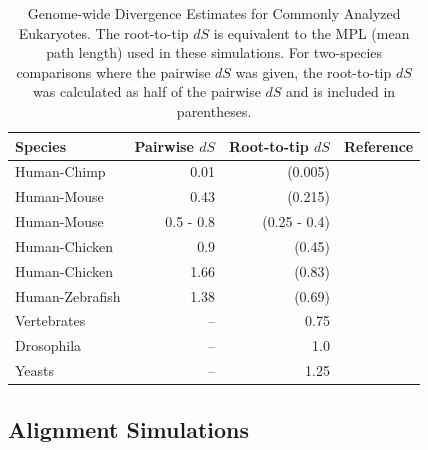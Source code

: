 \begin{table}
\centering
\begin{tabular}{lrrl}
\toprule
 Species & Pairwise $dS$ & Root-to-tip $dS$ & Reference \\
\midrule
   Human-Chimp & 0.01 & (0.005) & \citealp{Nei2010Neutral}
\\ Human-Mouse & 0.43 & (0.215) & \citealp{Nei2010Neutral}
\\ Human-Mouse & 0.5 - 0.8 & (0.25 - 0.4) & \citealp{Ogurtsov2004Indel}
\\ Human-Chicken & 0.9 & (0.45) & \citealp{Nei2010Neutral}
\\ Human-Chicken & 1.66 & (0.83) & \citealp{Hillier2004}
\\ Human-Zebrafish & 1.38 & (0.69) & \citealp{Nei2010Neutral}
\\ Vertebrates & -- & 0.75 & \citealp{Siepel2005}
\\ Drosophila & -- & 1.0 & \citealp{Siepel2005}
\\ Yeasts & -- & 1.25 & \citealp{Siepel2005} \\
\bottomrule
\end{tabular}
\caption{Genome-wide Divergence Estimates for Commonly Analyzed
  Eukaryotes. The root-to-tip $dS$ is equivalent to the MPL (mean path
  length) used in these simulations. For two-species comparisons where
  the pairwise $dS$ was given, the root-to-tip $dS$ was calculated as
  half of the pairwise $dS$ and is included in parentheses.}
\label{table_2}
\end{table}

\subsection{Alignment Simulations}

